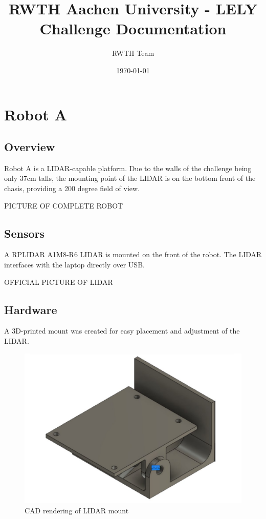 \documentclass[11pt]{article}
\title{RWTH Aachen University - LELY Challenge Documentation}
\author{RWTH Team}
\date{\today}
\begin{document}
	\maketitle	
	
	\section{Robot A}
	
	\subsection{Overview}
	Robot A is a LIDAR-capable platform. Due to the walls of the challenge being only 37cm talls, the mounting point of the LIDAR is on the bottom front of the chasis, providing a 200 degree field of view.
	
	PICTURE OF COMPLETE ROBOT
	
	\subsection{Sensors}
	A RPLIDAR A1M8-R6 LIDAR is mounted on the front of the robot. The LIDAR interfaces with the laptop directly over USB. 
	
	OFFICIAL PICTURE OF LIDAR
	
	\subsection{Hardware}
	A 3D-printed mount was created for easy placement and adjustment of the LIDAR.
	
	\begin{figure}[h]
		\centering
		\includegraphics[scale=0.6]{lidar_mount}
		\caption{CAD rendering of LIDAR mount}
	\end{figure}
	
\end{document}
